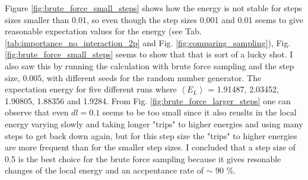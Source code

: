 Figure \ref{fig:brute_force_small_steps} shows how the energy is not stable for steps sizes smaller than 0.01, so even though the step sizes 0.001 and 0.01 seems to give reasonable expectation values for the energy (see Tab. \ref{tab:importance_no_interaction_2p} and Fig. \ref{fig:comparing_sampling}), Fig. \ref{fig:brute_force_small_steps} seems to show that that is sort of a lucky shot. I also saw this by running the calculation with brute force sampling and the step size, $0.005$, with different seeds for the random number generator. The expectation energy for five different runs where $\left< E_L \right>$ =  1.91487, 2.03452, 1.90805, 1.88356 and 1.9284. From Fig. \ref{fig:brute_force_larger_steps} one can observe that even $dl=0.1$ seems to be too small since it also reuslts in the local energy varying slowly and taking longer "trips" to higher energies and using many steps to get back down again, but for this step size the "trips" to higher energies are more frequent than for the smaller step sizes. I concluded that a step size of 0.5 is the best choice for the brute force sampling because it gives resonable changes of the local energy and an accpentance rate of $\sim$ 90 \%. 

